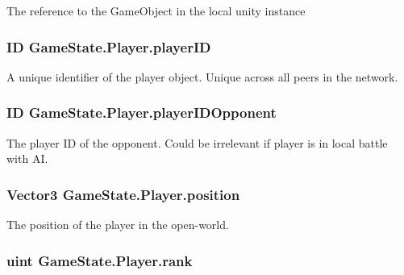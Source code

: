The reference to the Game\-Object in the local unity instance 

\hypertarget{class_game_state_1_1_player_acbd28d89e6eb8611aa66452ec31e9133}{
\subsubsection[{player\-I\-D}]{\setlength{\rightskip}{0pt plus 5cm}I\-D Game\-State.\-Player.\-player\-I\-D}}\label{class_game_state_1_1_player_acbd28d89e6eb8611aa66452ec31e9133}


A unique identifier of the player object. Unique across all peers in the network. 

\hypertarget{class_game_state_1_1_player_aaed188c94b7f6be4dabe39744aa818ca}{
\subsubsection[{player\-I\-D\-Opponent}]{\setlength{\rightskip}{0pt plus 5cm}I\-D Game\-State.\-Player.\-player\-I\-D\-Opponent}}\label{class_game_state_1_1_player_aaed188c94b7f6be4dabe39744aa818ca}


The player I\-D of the opponent. Could be irrelevant if player is in local battle with A\-I. 

\hypertarget{class_game_state_1_1_player_a24a9ccd0325cae667f125821b3be79c2}{
\subsubsection[{position}]{\setlength{\rightskip}{0pt plus 5cm}Vector3 Game\-State.\-Player.\-position}}\label{class_game_state_1_1_player_a24a9ccd0325cae667f125821b3be79c2}


The position of the player in the open-\/world. 

\hypertarget{class_game_state_1_1_player_a6cf0778cc27a824eac211b8b29b3dfcc}{
\subsubsection[{rank}]{\setlength{\rightskip}{0pt plus 5cm}uint Game\-State.\-Player.\-rank}}\label{class_game_state_1_1_player_a6cf0778cc27a824eac211b8b29b3dfcc}


